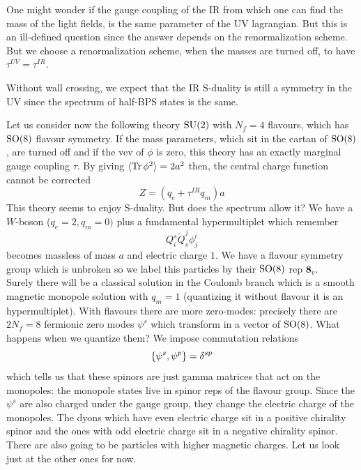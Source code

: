 One might wonder if the gauge coupling of the IR from which one can find the mass of the light fields, is the same parameter of the UV lagrangian. But this is an ill-defined question since the answer depends on the renormalization scheme. But we choose a renormalization scheme, when the masses are turned off, to have $\tau^{UV}=\tau^{IR}$.

Without wall crossing, we expect that the IR S-duality is still a symmetry in the UV since the spectrum of half-BPS states is the same.

Let us consider now the following theory $\mathrm{SU}(2)$ with $N_{f}=4$ flavours, which has $\mathrm{SO}(8)$ flavour symmetry. If the mass parameters, which sit in the cartan of $\mathrm{SO}(8)$, are turned off and if the vev of $\phi$ is zero, this theory has an exactly marginal gauge coupling $\tau$. By giving $\langle\operatorname{Tr}\phi^{2}\rangle=2a^{2}$ then, the central charge function cannot be corrected
\begin{equation}
	Z=(q_{e}+\tau^{IR}q_{m})a
\end{equation}
This theory seems to enjoy S-duality. But does the spectrum allow it? We have a $W$-boson ($q_{e}=2,q_{m}=0)$ plus a fundamental hypermultiplet which remember
\begin{equation}
	Q_{i}^{s}\tilde Q_{s}^{j}\phi^{i}_{j}
\end{equation}
becomes massless of mass $a$ and electric charge $1$. We have a flavour symmetry group which is unbroken so we label this particles by their $\mathrm{SO}(8)$ rep $\mathbf{8}_{v}$.\\
Surely there will be a classical solution in the Coulomb branch which is a smooth magnetic monopole solution with $q_{m}=1$ (quantizing it without flavour it is an hypermultiplet). With flavours there are more zero-modes: precisely there are $2N_{f}=8$ fermionic zero modes $\psi^{s}$ which transform in a vector of $\mathrm{SO}(8)$. What happens when we quantize them? We impose commutation relations
\begin{equation}
	\acomm{\psi^{s}}{\psi^{p}}=\delta^{sp}
\end{equation}
which tells us that these spinors are just gamma matrices that act on the monopoles: the monopole states live in spinor reps of the flavour group. Since the $\psi^{s}$ are also charged under the gauge group, they change the electric charge of the monopoles. The dyons
which have even electric charge sit in a positive chirality spinor and the ones with odd electric charge sit in a negative chirality spinor. There are also going to be particles with higher magnetic charges. Let us look just at the other ones for now.		
